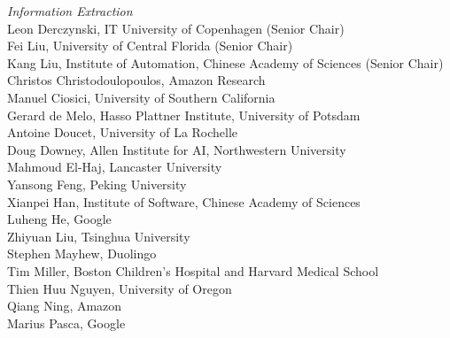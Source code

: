 \emph{Information Extraction} \\
\hspace*{0.2in} Leon Derczynski, IT University of Copenhagen (Senior Chair)\\
\hspace*{0.2in} Fei Liu, University of Central Florida (Senior Chair)\\
\hspace*{0.2in} Kang Liu, Institute of Automation, Chinese Academy of Sciences (Senior Chair)\\
\hspace*{0.2in} Christos Christodoulopoulos, Amazon Research\\
\hspace*{0.2in} Manuel Ciosici, University of Southern California\\
\hspace*{0.2in} Gerard de Melo, Hasso Plattner Institute, University of Potsdam\\
\hspace*{0.2in} Antoine Doucet, University of La Rochelle\\
\hspace*{0.2in} Doug Downey, Allen Institute for AI, Northwestern University\\
\hspace*{0.2in} Mahmoud El-Haj, Lancaster University\\
\hspace*{0.2in} Yansong Feng, Peking University\\
\hspace*{0.2in} Xianpei Han, Institute of Software, Chinese Academy of Sciences\\
\hspace*{0.2in} Luheng He, Google\\
\hspace*{0.2in} Zhiyuan Liu, Tsinghua University\\
\hspace*{0.2in} Stephen Mayhew, Duolingo\\
\hspace*{0.2in} Tim Miller, Boston Children's Hospital and Harvard Medical School\\
\hspace*{0.2in} Thien Huu Nguyen, University of Oregon\\
\hspace*{0.2in} Qiang Ning, Amazon\\
\hspace*{0.2in} Marius Pasca, Google\\
